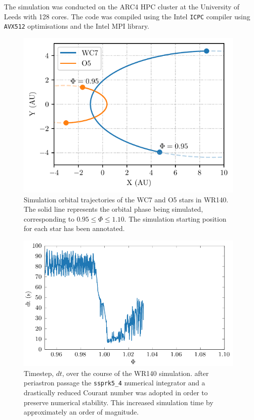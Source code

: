 \documentclass[fleqn,usenatbib]{mnras}
\begin{document}
The simulation was conducted on the ARC4 HPC cluster at the University of Leeds with 128 cores.
The code was compiled using the Intel \texttt{ICPC} compiler using \texttt{AVX512} optimisations and the Intel MPI library.

\begin{figure}
  \centering
  \includegraphics[width=\linewidth]{assets/wr140-path.pdf}
  \caption[Simulation orbital trajectories of WR140 WC7 and O5 stars]{Simulation orbital trajectories of the WC7 and O5 stars in WR140. The solid line represents the orbital phase being simulated, corresponding to $0.95 \leq \Phi \leq 1.10$. The simulation starting position for each star has been annotated.}
  \label{fig:p2-trajectory}
\end{figure}

\begin{figure}
  \centering
  \includegraphics[width=\linewidth]{assets/wr140-dt.pdf}
  \caption[Timestep over WR140 simulation]{Timestep, $dt$, over the course of the WR140 simulation. after periastron passage the \texttt{ssprk5\_4} numerical integrator and a drastically reduced Courant number was adopted in order to preserve numerical stability. This increased simulation time by approximately an order of magnitude.}
  \label{fig:p2-timestep}
\end{figure}








\bsp	%
\label{lastpage}
\end{document}
